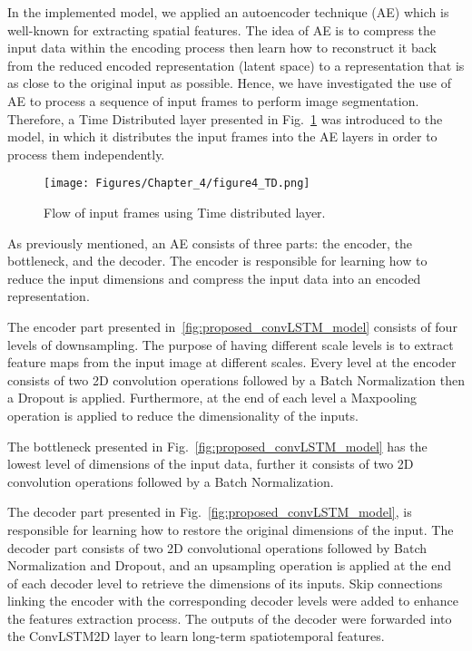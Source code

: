 In the implemented model, we applied an autoencoder technique (AE) which is well-known for extracting spatial features.
The idea of AE is to compress the input data within the encoding process then learn how to reconstruct it back from the reduced encoded representation (latent space) to a representation that is as close to the original input as possible. 
Hence, we have investigated the use of AE to process a sequence of input frames to perform image segmentation.
Therefore, a Time Distributed layer presented in Fig.~\ref{fig:TD} was introduced to the model, in which it distributes the input frames into the AE layers in order to process them independently.
\begin{figure}[!h]
	\centering
	\texttt{[image: Figures/Chapter\_4/figure4\_TD.png]}
	\caption{Flow of input frames using Time distributed layer.}
	\label{fig:TD}
\end{figure}

As previously mentioned, an AE consists of three parts: the encoder, the bottleneck, and the decoder.
The encoder is responsible for learning how to reduce the input dimensions and compress the input data into an encoded representation.

The encoder part presented in~\ref{fig:proposed_convLSTM_model} consists of four levels of downsampling. 
The purpose of having different scale levels is to extract feature maps from the input image at different scales.
Every level at the encoder consists of two 2D convolution operations followed by a Batch Normalization then a Dropout is applied. 
Furthermore, at the end of each level a Maxpooling operation is applied to reduce the dimensionality of the inputs. 

The bottleneck presented in Fig.~\ref{fig:proposed_convLSTM_model} has the lowest level of dimensions of the input data, further it consists of two 2D convolution operations followed by a Batch Normalization.

The decoder part presented in Fig.~\ref{fig:proposed_convLSTM_model}, is responsible for learning how to restore the original dimensions of the input.
The decoder part consists of two 2D convolutional operations followed by Batch Normalization and Dropout, and an upsampling operation is applied at the end of each decoder level to retrieve the dimensions of its inputs.
Skip connections linking the encoder with the corresponding decoder levels were added to enhance the features extraction process.
The outputs of the decoder were forwarded into the ConvLSTM2D layer to learn long-term spatiotemporal features.

